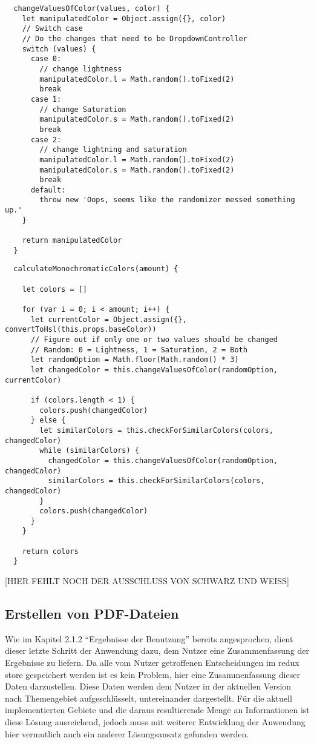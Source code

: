 \begin{lstlisting}
  changeValuesOfColor(values, color) {
    let manipulatedColor = Object.assign({}, color)
    // Switch case
    // Do the changes that need to be DropdownController
    switch (values) {
      case 0:
        // change lightness
        manipulatedColor.l = Math.random().toFixed(2)
        break
      case 1:
        // change Saturation
        manipulatedColor.s = Math.random().toFixed(2)
        break
      case 2:
        // change lightning and saturation
        manipulatedColor.l = Math.random().toFixed(2)
        manipulatedColor.s = Math.random().toFixed(2)
        break
      default:
        throw new 'Oops, seems like the randomizer messed something up.'
    }

    return manipulatedColor
  }
\end{lstlisting}

\begin{lstlisting}
  calculateMonochromaticColors(amount) {

    let colors = []

    for (var i = 0; i < amount; i++) {
      let currentColor = Object.assign({}, convertToHsl(this.props.baseColor))
      // Figure out if only one or two values should be changed
      // Random: 0 = Lightness, 1 = Saturation, 2 = Both
      let randomOption = Math.floor(Math.random() * 3)
      let changedColor = this.changeValuesOfColor(randomOption, currentColor)

      if (colors.length < 1) {
        colors.push(changedColor)
      } else {
        let similarColors = this.checkForSimilarColors(colors, changedColor)
        while (similarColors) {
          changedColor = this.changeValuesOfColor(randomOption, changedColor)
          similarColors = this.checkForSimilarColors(colors, changedColor)
        }
        colors.push(changedColor)
      }
    }

    return colors
  }
\end{lstlisting}

[HIER FEHLT NOCH DER AUSSCHLUSS VON SCHWARZ UND WEISS]


\subsection{Erstellen von PDF-Dateien}
Wie im Kapitel 2.1.2 “Ergebnisse der Benutzung”  bereits angesprochen, dient dieser letzte Schritt der Anwendung dazu, dem Nutzer eine Zusammenfassung der Ergebnisse zu liefern.
Da alle vom Nutzer getroffenen Entscheidungen im redux store gespeichert werden ist es kein Problem, hier eine Zusammenfassung dieser Daten darzustellen.
Diese Daten werden dem Nutzer in der aktuellen Version nach Themengebiet aufgeschlüsselt, untereinander dargestellt. Für die aktuell implementierten Gebiete und die daraus resultierende Menge an Informationen ist diese Lösung ausreichend, jedoch muss mit weiterer Entwicklung der Anwendung hier vermutlich auch ein anderer Lösungsansatz gefunden werden.

